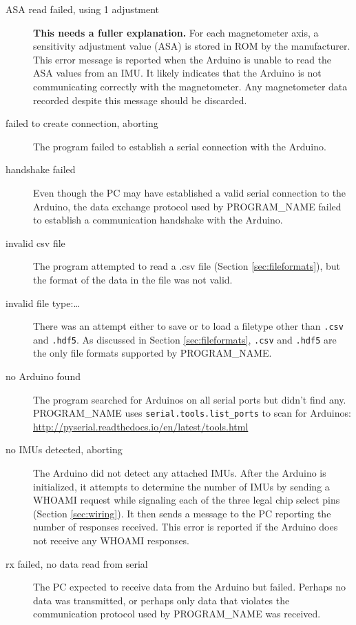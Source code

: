 \documentclass[11pt,letterpaper,article,oneside]{memoir}
\newcommand{\name}{PROGRAM\_NAME}
\newcommand{\csv}{\texttt{.csv}}
\newcommand{\hdf}{\texttt{.hdf5}}
\begin{document}
\begin{description}

\item[ASA read failed, using 1 adjustment]
\textbf{This needs a fuller explanation.}
For each magnetometer axis, a sensitivity adjustment value (ASA) is stored in
ROM by the manufacturer.  This error message is reported when the Arduino is
unable to read the ASA values from an IMU.  It likely indicates that the Arduino
is not communicating correctly with the magnetometer.  Any magnetometer data
recorded despite this message should be discarded.
\genericFix{}

\item[failed to create connection, aborting]
The program failed to establish a serial connection with the Arduino.
\genericFix{}

\item[handshake failed]
Even though the PC may have established a valid serial connection to the
Arduino, the data exchange protocol used by \name{} failed to establish a
communication handshake with the Arduino.
\genericFix{}

\item[invalid csv file]
The program attempted to read a .csv file (Section \ref{sec:fileformats}), but
the format of the data in the file was not valid.

\item[invalid file type:\ldots]
There was an attempt either to save or to load a filetype other than
\csv{} and \hdf{}. As discussed in Section \ref{sec:fileformats},
\csv{} and \hdf{} are the only file formats supported by \name.

\item[no Arduino found]
The program searched for Arduinos on all serial ports but didn't find any.
\name{} uses \texttt{serial.tools.list\_ports} to scan for Arduinos:
\url{http://pyserial.readthedocs.io/en/latest/tools.html}

\item[no IMUs detected, aborting]
The Arduino did not detect any attached IMUs.  After the Arduino is initialized,
it attempts to determine the number of IMUs by sending a WHOAMI request while
signaling each of the three legal chip select pins (Section \ref{sec:wiring}).
It then sends a message to the PC reporting the number of responses received. This
error is reported if the Arduino does not receive any WHOAMI responses.
\genericFix{}

\item[rx failed, no data read from serial]
The PC expected to receive data from the Arduino but failed. Perhaps no data was
transmitted, or perhaps only data that violates the communication protocol used
by \name{} was received.
\genericFix{}


\end{description}
\end{document}
